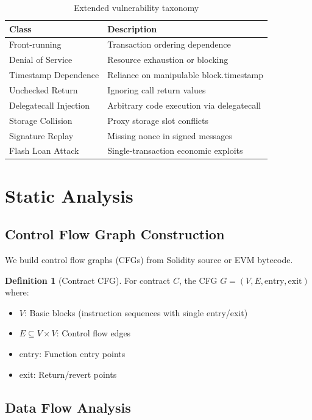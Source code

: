 \documentclass[11pt,a4paper]{article}
\theoremstyle{definition}
\newtheorem{definition}{Definition}
\begin{document}
\begin{table}[h]
\centering
\begin{tabular}{lp{8cm}}
\toprule
\textbf{Class} & \textbf{Description} \\
\midrule
Front-running & Transaction ordering dependence \\
Denial of Service & Resource exhaustion or blocking \\
Timestamp Dependence & Reliance on manipulable block.timestamp \\
Unchecked Return & Ignoring call return values \\
Delegatecall Injection & Arbitrary code execution via delegatecall \\
Storage Collision & Proxy storage slot conflicts \\
Signature Replay & Missing nonce in signed messages \\
Flash Loan Attack & Single-transaction economic exploits \\
\bottomrule
\end{tabular}
\caption{Extended vulnerability taxonomy}
\end{table}

\section{Static Analysis}

\subsection{Control Flow Graph Construction}

We build control flow graphs (CFGs) from Solidity source or EVM bytecode.

\begin{definition}[Contract CFG]
For contract $C$, the CFG $G = (V, E, \text{entry}, \text{exit})$ where:
\begin{itemize}
    \item $V$: Basic blocks (instruction sequences with single entry/exit)
    \item $E \subseteq V \times V$: Control flow edges
    \item $\text{entry}$: Function entry points
    \item $\text{exit}$: Return/revert points
\end{itemize}
\end{definition}

\subsection{Data Flow Analysis}
\end{document}
